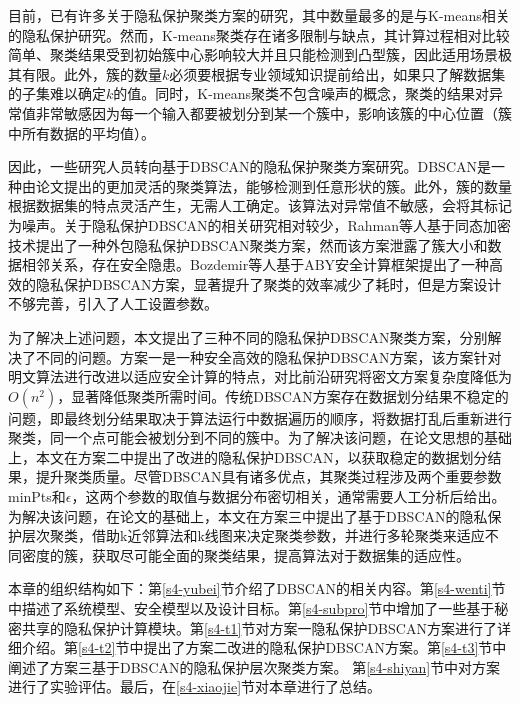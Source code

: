 目前，已有许多关于隐私保护聚类方案的研究，其中数量最多的是与K-means相关的隐私保护研究\cite{hegde2021sok}。然而，K-means聚类存在诸多限制与缺点，其计算过程相对比较简单、聚类结果受到初始簇中心影响较大并且只能检测到凸型簇，因此适用场景极其有限。此外，簇的数量$k$必须要根据专业领域知识提前给出，如果只了解数据集的子集难以确定$k$的值。同时，K-means聚类不包含噪声的概念，聚类的结果对异常值非常敏感因为每一个输入都要被划分到某一个簇中，影响该簇的中心位置（簇中所有数据的平均值）。

因此，一些研究人员转向基于DBSCAN的隐私保护聚类方案研究。DBSCAN是一种由论文\cite{ester1996density}提出的更加灵活的聚类算法，能够检测到任意形状的簇。此外，簇的数量根据数据集的特点灵活产生，无需人工确定。该算法对异常值不敏感，会将其标记为噪声。关于隐私保护DBSCAN的相关研究相对较少，Rahman等人\cite{rahman2017towards}基于同态加密技术提出了一种外包隐私保护DBSCAN聚类方案，然而该方案泄露了簇大小和数据相邻关系，存在安全隐患。Bozdemir等人\cite{bozdemir2021privacy}基于ABY安全计算框架提出了一种高效的隐私保护DBSCAN方案，显著提升了聚类的效率减少了耗时，但是方案设计不够完善，引入了人工设置参数。

为了解决上述问题，本文提出了三种不同的隐私保护DBSCAN聚类方案，分别解决了不同的问题。方案一是一种安全高效的隐私保护DBSCAN方案，该方案针对明文算法进行改进以适应安全计算的特点，对比前沿研究将密文方案复杂度降低为$O(n^2)$，显著降低聚类所需时间。传统DBSCAN方案存在数据划分结果不稳定的问题，即最终划分结果取决于算法运行中数据遍历的顺序，将数据打乱后重新进行聚类，同一个点可能会被划分到不同的簇中。为了解决该问题，在论文\cite{tran2013revised}思想的基础上，本文在方案二中提出了改进的隐私保护DBSCAN，以获取稳定的数据划分结果，提升聚类质量。尽管DBSCAN具有诸多优点，其聚类过程涉及两个重要参数minPts和$\epsilon$，这两个参数的取值与数据分布密切相关，通常需要人工分析后给出。为解决该问题，在论文\cite{latifi2021dbhc}的基础上，本文在方案三中提出了基于DBSCAN的隐私保护层次聚类，借助k近邻算法和k线图来决定聚类参数，并进行多轮聚类来适应不同密度的簇，获取尽可能全面的聚类结果，提高算法对于数据集的适应性。

本章的组织结构如下：第\ref{s4-yubei}节介绍了DBSCAN的相关内容。第\ref{s4-wenti}节中描述了系统模型、安全模型以及设计目标。第\ref{s4-subpro}节中增加了一些基于秘密共享的隐私保护计算模块。第\ref{s4-t1}节对方案一隐私保护DBSCAN方案进行了详细介绍。第\ref{s4-t2}节中提出了方案二改进的隐私保护DBSCAN方案。第\ref{s4-t3}节中阐述了方案三基于DBSCAN的隐私保护层次聚类方案。
第\ref{s4-shiyan}节中对方案进行了实验评估。最后，在\ref{s4-xiaojie}节对本章进行了总结。

